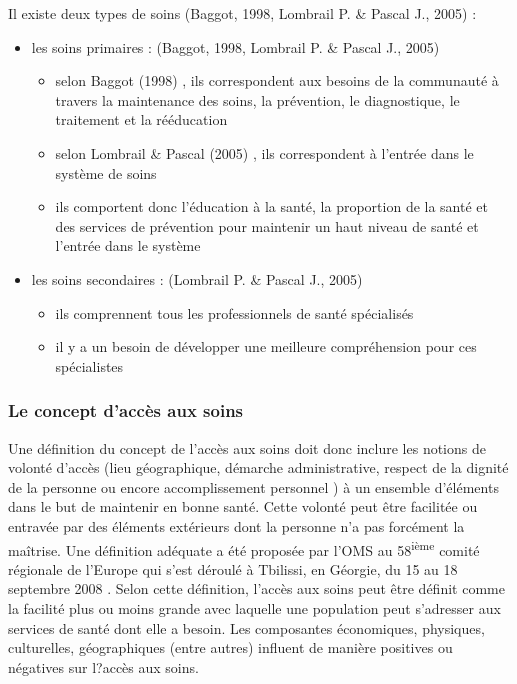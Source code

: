 Il existe deux types de soins (Baggot, 1998, Lombrail P. \& Pascal J., 2005) \cite{Baggot1998} \cite{LombrailPascal2005} : 
\begin{itemize}
\item les soins primaires : (Baggot, 1998, Lombrail P. \& Pascal J., 2005) \cite{Baggot1998} \cite{LombrailPascal2005}
\begin{itemize}
\item selon Baggot (1998) \cite{Baggot1998}, ils correspondent aux besoins de la communauté à travers la maintenance des soins, la prévention, le diagnostique, le traitement et la rééducation
\item selon Lombrail \& Pascal (2005) \cite{LombrailPascal2005}, ils correspondent à l'entrée dans le système de soins
\item ils comportent donc l'éducation à la santé, la proportion de la santé et des services de prévention pour maintenir un haut niveau de santé et l'entrée dans le système
\end{itemize} 
\item les soins secondaires : (Lombrail P. \& Pascal J., 2005)\cite{LombrailPascal2005}
\begin{itemize}
\item ils comprennent tous les professionnels de santé spécialisés
\item il y a un besoin de développer une meilleure compréhension pour ces spécialistes
\end{itemize} 
\end{itemize}

\subsubsection{Le concept d'accès aux soins }

Une définition du concept de \og l'accès aux soins\fg{}  doit donc inclure les notions de volonté d'accès (lieu géographique, démarche administrative, respect de la dignité de la personne ou encore accomplissement personnel ) à un ensemble d'éléments dans le but de maintenir en bonne santé. Cette volonté peut être facilitée ou entravée par des éléments extérieurs dont la personne n'a pas forcément la maîtrise.
Une définition adéquate a été proposée par l'OMS  au 58\textsuperscript{ième} comité régionale de l'Europe qui s'est déroulé à Tbilissi, en Géorgie, du 15 au 18 septembre 2008 \cite{OMS2008}. Selon cette définition, l'accès aux soins peut être définit comme la facilité plus ou moins grande avec laquelle une population peut s'adresser aux services de santé dont elle a besoin. Les composantes économiques, physiques, culturelles, géographiques (entre autres) influent de manière positives ou négatives sur l?accès aux soins.


